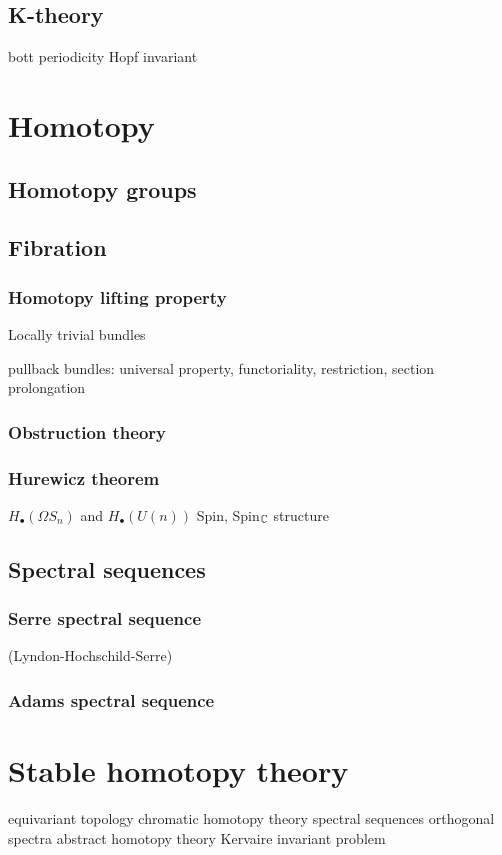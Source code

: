 \documentclass{../../large}
\begin{document}
\chapter{K-theory}

bott periodicity
Hopf invariant






\part{Homotopy}

\chapter{Homotopy groups}




\chapter{Fibration}
\section{Homotopy lifting property}


Locally trivial bundles

pullback bundles: universal property, functoriality, restriction,
section prolongation

\section{Obstruction theory}
\section{Hurewicz theorem}
$H_\bullet(\Omega S_n)$ and $H_\bullet(U(n))$
Spin, Spin$_{\mathbb{C}}$ structure



\chapter{Spectral sequences}
\section{Serre spectral sequence}
	(Lyndon-Hochschild-Serre)
\section{Adams spectral sequence}







\part{Stable homotopy theory}
equivariant topology
chromatic homotopy theory
spectral sequences
orthogonal spectra
abstract homotopy theory
Kervaire invariant problem
\end{document}
